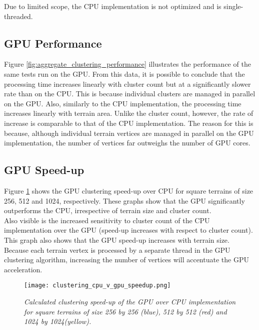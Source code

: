Due to limited scope, the CPU implementation is not optimized and is single-threaded.\\

\subsection{GPU Performance}

Figure \ref{fig:aggregate_clustering_performance} illustrates the performance of the same tests run on the GPU. From this data, it is possible to conclude that the processing time increases linearly with cluster count but at a significantly slower rate than on the CPU. This is because individual clusters are managed in parallel on the GPU. Also, similarly to the CPU implementation, the processing time increases linearly with terrain area. Unlike the cluster count, however, the rate of increase is comparable to that of the CPU implementation. The reason for this is because, although individual terrain vertices are managed in parallel on the GPU implementation, the number of vertices far outweighs the number of GPU cores. 

\subsection{GPU Speed-up}

Figure \ref{fig:clustering_cpu_v_gpu_speedup} shows the GPU clustering speed-up over CPU for square terrains of size 256, 512 and 1024, respectively. These graphs show that the GPU significantly outperforms the CPU, irrespective of terrain size and cluster count. \\
Also visible is the increased sensitivity to cluster count of the CPU implementation over the GPU (speed-up increases with respect to cluster count). \\
This graph also shows that the GPU speed-up increases with terrain size. Because each terrain vertex is processed by a separate thread in the GPU clustering algorithm, increasing the number of vertices will accentuate the GPU acceleration. \\

\begin{figure}
\center
	\texttt{[image: clustering\_cpu\_v\_gpu\_speedup.png]}
	\caption{ \textit{Calculated clustering speed-up of the GPU over CPU implementation for square terrains of size 256 by 256 (blue), 512 by 512 (red) and 1024 by 1024(yellow).}}	
	\label{fig:clustering_cpu_v_gpu_speedup}
\end{figure}